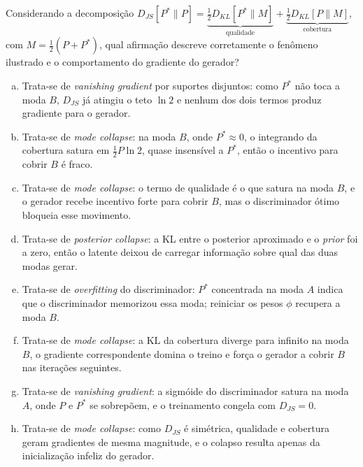 \documentclass[11pt,a4paper]{article}
\begin{document}
\begin{enumerate}[1)]
\begin{center}
\end{center}

Considerando a decomposição $D_{JS}[P^{*}\|P] = \underbrace{\tfrac{1}{2}D_{KL}[P^{*}\|M]}_{\text{qualidade}} + \underbrace{\tfrac{1}{2}D_{KL}[P\|M]}_{\text{cobertura}}$, com $M = \tfrac{1}{2}(P + P^{*})$, qual afirmação descreve corretamente o fenômeno ilustrado e o comportamento do gradiente do gerador?
\begin{enumerate}[a)]
    \item Trata-se de \textit{vanishing gradient} por suportes disjuntos: como $P^{*}$ não toca a moda $B$, $D_{JS}$ já atingiu o teto $\ln 2$ e nenhum dos dois termos produz gradiente para o gerador.
    \item Trata-se de \textit{mode collapse}: na moda $B$, onde $P^{*} \approx 0$, o integrando da cobertura satura em $\tfrac{1}{2}P\ln 2$, quase insensível a $P^{*}$, então o incentivo para cobrir $B$ é fraco.
    \item Trata-se de \textit{mode collapse}: o termo de qualidade é o que satura na moda $B$, e o gerador recebe incentivo forte para cobrir $B$, mas o discriminador ótimo bloqueia esse movimento.
    \item Trata-se de \textit{posterior collapse}: a KL entre o posterior aproximado e o \textit{prior} foi a zero, então o latente deixou de carregar informação sobre qual das duas modas gerar.
    \item Trata-se de \textit{overfitting} do discriminador: $P^{*}$ concentrada na moda $A$ indica que o discriminador memorizou essa moda; reiniciar os pesos $\phi$ recupera a moda $B$.
    \item Trata-se de \textit{mode collapse}: a KL da cobertura diverge para infinito na moda $B$, o gradiente correspondente domina o treino e força o gerador a cobrir $B$ nas iterações seguintes.
    \item Trata-se de \textit{vanishing gradient}: a sigmóide do discriminador satura na moda $A$, onde $P$ e $P^{*}$ se sobrepõem, e o treinamento congela com $D_{JS} = 0$.
    \item Trata-se de \textit{mode collapse}: como $D_{JS}$ é simétrica, qualidade e cobertura geram gradientes de mesma magnitude, e o colapso resulta apenas da inicialização infeliz do gerador.
\end{enumerate}


\end{enumerate}
\end{document}
